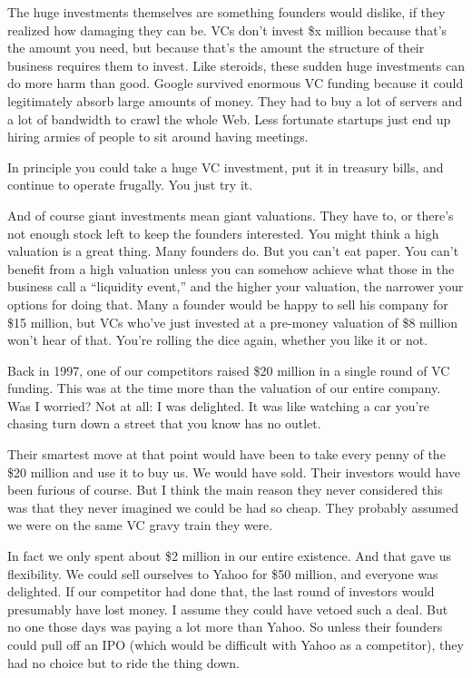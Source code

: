 The huge investments themselves are something founders would dislike, if
they realized how damaging they can be. VCs don't invest \$x million
because that's the amount you need, but because that's the amount the
structure of their business requires them to invest. Like steroids,
these sudden huge investments can do more harm than good. Google
survived enormous VC funding because it could legitimately absorb large
amounts of money. They had to buy a lot of servers and a lot of
bandwidth to crawl the whole Web. Less fortunate startups just end up
hiring armies of people to sit around having meetings.

In principle you could take a huge VC investment, put it in treasury
bills, and continue to operate frugally. You just try it.

And of course giant investments mean giant valuations. They have to, or
there's not enough stock left to keep the founders interested. You might
think a high valuation is a great thing. Many founders do. But you can't
eat paper. You can't benefit from a high valuation unless you can
somehow achieve what those in the business call a ``liquidity event,''
and the higher your valuation, the narrower your options for doing that.
Many a founder would be happy to sell his company for \$15 million, but
VCs who've just invested at a pre-money valuation of \$8 million won't
hear of that. You're rolling the dice again, whether you like it or not.

Back in 1997, one of our competitors raised \$20 million in a single
round of VC funding. This was at the time more than the valuation of our
entire company. Was I worried? Not at all: I was delighted. It was like
watching a car you're chasing turn down a street that you know has no
outlet.

Their smartest move at that point would have been to take every penny of
the \$20 million and use it to buy us. We would have sold. Their
investors would have been furious of course. But I think the main reason
they never considered this was that they never imagined we could be had
so cheap. They probably assumed we were on the same VC gravy train they
were.

In fact we only spent about \$2 million in our entire existence. And
that gave us flexibility. We could sell ourselves to Yahoo for \$50
million, and everyone was delighted. If our competitor had done that,
the last round of investors would presumably have lost money. I assume
they could have vetoed such a deal. But no one those days was paying a
lot more than Yahoo. So unless their founders could pull off an IPO
(which would be difficult with Yahoo as a competitor), they had no
choice but to ride the thing down.

